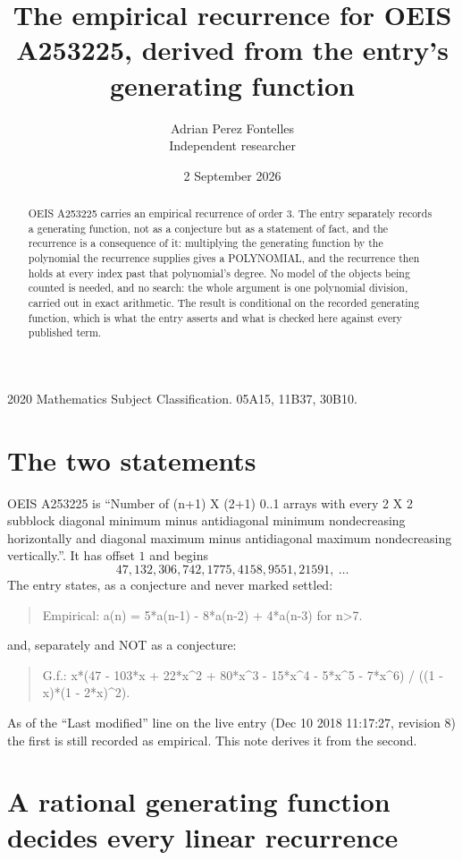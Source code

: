 \documentclass[11pt,a4paper]{article}
\title{The empirical recurrence for OEIS A253225, derived from the entry's generating function}
\author{Adrian Perez Fontelles\\ \small Independent researcher}
\date{2 September 2026}
\theoremstyle{plain}
\theoremstyle{definition}
\begin{document}
\maketitle

\begin{abstract}
OEIS A253225 carries an empirical recurrence of order $3$. The entry separately records a
generating function, not as a conjecture but as a statement of fact, and the recurrence is a
consequence of it: multiplying the generating function by the polynomial the recurrence
supplies gives a POLYNOMIAL, and the recurrence then holds at every index past that
polynomial's degree. No model of the objects being counted is needed, and no search: the
whole argument is one polynomial division, carried out in exact arithmetic. The result is
conditional on the recorded generating function, which is what the entry asserts and what is
checked here against every published term.
\end{abstract}

\noindent\small 2020 Mathematics Subject Classification. 05A15, 11B37, 30B10.\normalsize

\section{The two statements}

OEIS A253225 is ``Number of (n+1) X (2+1) 0..1 arrays with every 2 X 2 subblock diagonal minimum minus antidiagonal minimum nondecreasing horizontally and diagonal maximum minus antidiagonal maximum nondecreasing vertically.''. It has offset $1$ and begins
\[
47, 132, 306, 742, 1775, 4158, 9551, 21591,\ \dots
\]
The entry states, as a conjecture and never marked settled:
\begin{quote}
Empirical: a(n) = 5*a(n-1) - 8*a(n-2) + 4*a(n-3) for n>7.
\end{quote}
and, separately and NOT as a conjecture:
\begin{quote}
G.f.: x*(47 - 103*x + 22*x\^{}2 + 80*x\^{}3 - 15*x\^{}4 - 5*x\^{}5 - 7*x\^{}6) / ((1 - x)*(1 - 2*x)\^{}2).
\end{quote}
As of the ``Last modified'' line on the live entry (Dec 10 2018 11:17:27, revision 8) the first is still
recorded as empirical. This note derives it from the second.

\section{A rational generating function decides every linear recurrence}
\end{document}
